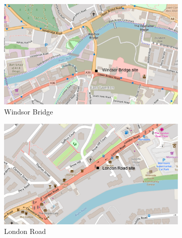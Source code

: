 \documentclass[11pt,twosided,a4paper]{report}
\begin{document}
\begin{figure}[!tb]
    \centering
    \begin{minipage}{.9\linewidth}
            \begin{subfigure}[t]{.5\linewidth}
                \includegraphics[width=\textwidth]{images/windsor_bridge}
                \caption{Windsor Bridge}
                \label{fig: windsor_bridge}
            \end{subfigure} \hspace{5mm}
            \begin{subfigure}[t]{.5\linewidth}
            	\includegraphics[width=\textwidth]{images/london_road}
            	\caption{London Road}
            	\label{fig: london_road}
	   \end{subfigure}
        \end{minipage}
    \begin{minipage}{.9\linewidth}
        \vspace{4mm}
    	\centering
        \begin{subfigure}[t]{.5\linewidth}

\end{subfigure}
\end{minipage}
\end{figure}
\end{document}
